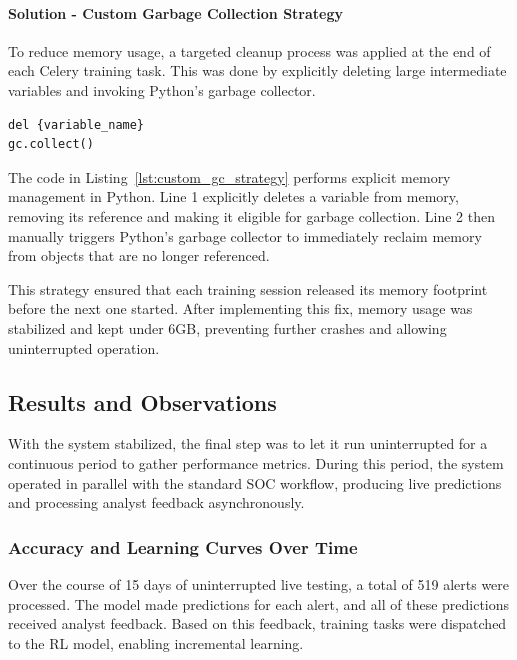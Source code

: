 \paragraph{Solution - Custom Garbage Collection Strategy}

To reduce memory usage, a targeted cleanup process was applied at the end of each Celery training task. 
This was done by explicitly deleting large intermediate variables and invoking Python's garbage collector.

\vspace{0.2cm}
\noindent
\begin{minipage}{\linewidth}
\begin{verbatim}
del {variable_name}
gc.collect()
\end{verbatim}
\label{lst:custom_gc_strategy}
\end{minipage}
\vspace{0.1cm}

The code in Listing~\ref{lst:custom_gc_strategy} performs explicit memory management in Python. 
Line 1 explicitly deletes a variable from memory, removing its reference and making it eligible for garbage collection. 
Line 2 then manually triggers Python's garbage collector to immediately reclaim memory from objects that are no longer referenced.

This strategy ensured that each training session released its memory footprint before the next one started. 
After implementing this fix, memory usage was stabilized and kept under 6GB, preventing further crashes and allowing uninterrupted operation.

\subsection{Results and Observations}

With the system stabilized, the final step was to let it run uninterrupted for a continuous period to gather performance metrics. 
During this period, the system operated in parallel with the standard SOC workflow, producing live predictions and processing analyst feedback asynchronously.

\subsubsection{Accuracy and Learning Curves Over Time}

Over the course of 15 days of uninterrupted live testing, a total of 519 alerts were processed. 
The model made predictions for each alert, and all of these predictions received analyst feedback. 
Based on this feedback, training tasks were dispatched to the RL model, enabling incremental learning.

